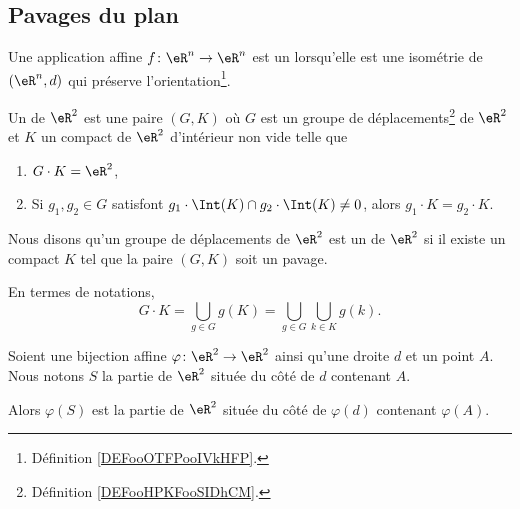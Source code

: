 
\subsection{Pavages du plan}

\begin{definition}      \label{DEFooHPKFooSIDhCM}
    Une application affine \( f\colon \eR^n\to \eR^n\) est un  lorsqu'elle est une isométrie de \( (\eR^n,d)\) qui préserve l'orientation\footnote{Définition \ref{DEFooOTFPooIVkHFP}.}.
\end{definition}

\begin{definition}      \label{DEFooJPHKooRgCBJs}
    Un  de \( \eR^2\) est une paire \( (G,K)\) où \( G\) est un groupe de déplacements\footnote{Définition \ref{DEFooHPKFooSIDhCM}.} de \( \eR^2\) et \( K\) un compact de \( \eR^2\) d'intérieur non vide telle que
    \begin{enumerate}
        \item
            \( G\cdot K=\eR^2\),
        \item       \label{ITEMooOIJZooZMKLUm}
            Si \( g_1,g_2\in G\) satisfont \( g_1\cdot \Int(K)\cap g_2\cdot\Int(K)\neq 0\), alors \( g_1\cdot K=g_2\cdot K\).
    \end{enumerate}
    Nous disons qu'un groupe de déplacements de \( \eR^2\) est un  de \( \eR^2\) si il existe un compact \( K\) tel que la paire \( (G,K)\) soit un pavage.
\end{definition}

En termes de notations,
\begin{equation}
    G\cdot K=\bigcup_{g\in G}g(K)=\bigcup_{g\in G}\bigcup_{k\in K}g(k).
\end{equation}

\begin{lemma}
    Soient une bijection affine \( \varphi\colon \eR^2\to \eR^2\) ainsi qu'une droite \( d\) et un point \( A\). Nous notons \( S\) la partie de \( \eR^2\) située du côté de \( d\) contenant \( A\).

    Alors \( \varphi(S)\) est la partie de \( \eR^2\) située du côté de \( \varphi(d)\) contenant \( \varphi(A)\).
\end{lemma}

